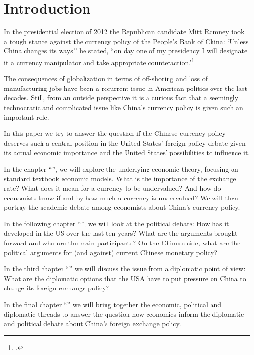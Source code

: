 \section{Introduction}
\label{sec:introduction}

In the presidential election of 2012 the Republican candidate Mitt 
Romney took a tough stance against the currency policy of the People's 
Bank of China: `Unless China changes its ways'' he stated, ``on day one 
of my presidency I will designate it a currency manipulator and take 
appropriate counteraction.'\footnote{\cite{Romney2012b}.}

The consequences of globalization in terms of off-shoring and loss of 
manufacturing jobs have been a recurrent issue in American politics over 
the last decades. Still, from an outside perspective it is a 
curious fact that a seemingly technocratic and complicated issue like 
China's currency policy is given such an important role.  

In this paper we try to answer the question if the Chinese currency 
policy deserves such a central position in the United States' foreign 
policy debate given its actual economic importance and the United 
States' possibilities to influence it.


In the chapter ``'', we will explore the 
underlying economic theory, focusing on standard textbook economic 
models.  What is the importance of the exchange rate?  What does it mean 
for a currency to be undervalued? And how do economists know if and by 
how much a currency is undervalued? We will then portray the academic 
debate among economists about China's currency policy. 

In the following chapter ``'', we will look at the 
political debate: How has it developed in the US over the last ten 
years?  What are the arguments brought forward and who are the main 
participants? On the Chinese side, what are the political arguments for 
(and against) current Chinese monetary policy?  

In the third chapter ``'' we will discuss the 
issue from a diplomatic point of view: What are the diplomatic options 
that the USA have to put pressure on China to change its foreign 
exchange policy? 

In the final chapter ``'' we will bring together 
the economic, political and diplomatic threads to answer the question 
how economics inform the diplomatic and political debate about China's 
foreign exchange policy. 
